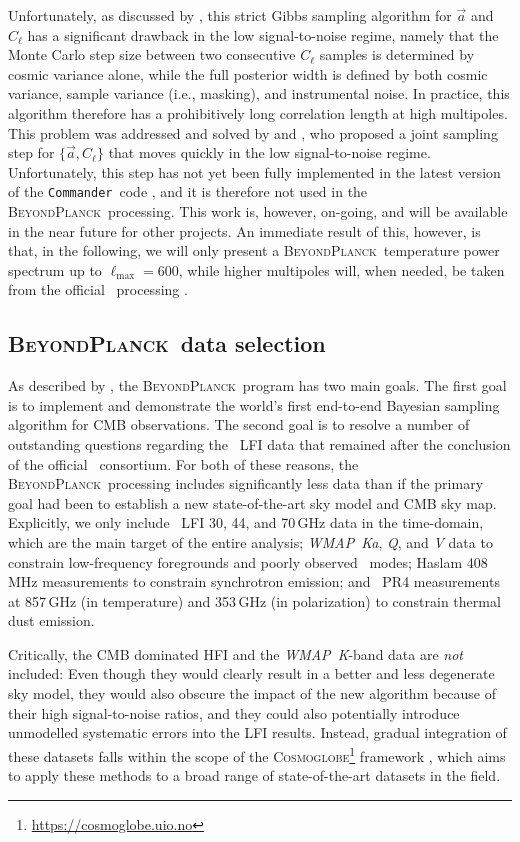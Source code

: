 \documentclass[twocolumn]{aa}
\def\cosmoglobe{\textsc{Cosmoglobe}}
\def\WMAP{\textit{WMAP}}
\def\commander{\texttt{Commander}}
\renewcommand{\a}[0]{\vec{a}}
\newcommand{\BP}{\textsc{BeyondPlanck}}
\begin{document}
Unfortunately, as discussed by \citet{eriksen:2004}, this strict Gibbs
sampling algorithm for $\a$ and $C_{\ell}$ has a significant drawback
in the low signal-to-noise regime, namely that the Monte Carlo step
size between two consecutive $C_{\ell}$ samples is determined by
cosmic variance alone, while the full posterior width is defined by
both cosmic variance, sample variance (i.e., masking), and
instrumental noise. In practice, this algorithm therefore has a
prohibitively long correlation length at high multipoles. This problem
was addressed and solved by \citet{jewell:2009} and
\citet{racine:2016}, who proposed a joint sampling step for
$\{\a,C_{\ell}\}$ that moves quickly in the low signal-to-noise
regime. Unfortunately, this step has not yet been fully implemented in
the latest version of the \commander\ code \citep{bp03}, and it is
therefore not used in the \BP\ processing. This work is, however,
on-going, and will be available in the near future for other
projects. An immediate result of this, however, is that, in the following,  we will only present a \BP\ temperature power spectrum up to
$\ell_{\mathrm{max}}=600$, while higher multipoles will, when needed, be
taken from the official \Planck\ processing \citep{planck2016-l05}. 

\subsection{\BP\ data selection}

As described by \citet{bp01}, the \BP\ program has two main goals. The
first goal is to implement and demonstrate the world's first
end-to-end Bayesian sampling algorithm for CMB observations. The
second goal is to resolve a number of outstanding questions regarding
the \Planck\ LFI data that remained after the conclusion of the
official \Planck\ consortium. For both of these reasons, the
\BP\ processing includes significantly less data than if the primary
goal had been to establish a new state-of-the-art sky model and CMB
sky map. Explicitly, we only include \Planck\ LFI 30, 44, and 70\,GHz
data in the time-domain, which are the main target of the entire analysis;
\WMAP\ \textit{Ka}, \textit Q, and \textit V data to constrain low-frequency foregrounds and
poorly observed \Planck\ modes; Haslam 408\,MHz measurements to
constrain synchrotron emission; and \Planck\ PR4 measurements at 857\,GHz (in
temperature) and 353\,GHz (in polarization) to constrain thermal dust
emission.

Critically, the CMB dominated HFI and the \WMAP\ \textit K-band data are
\emph{not} included: Even though they would clearly result in a better
and less degenerate sky model, they would also obscure the impact of
the new algorithm because of their high signal-to-noise ratios, and
they could also potentially introduce unmodelled systematic errors
into the LFI results. Instead, gradual integration of these datasets
falls within the scope of the
\cosmoglobe\footnote{\url{https://cosmoglobe.uio.no}} framework
\citep{bp05,bp17}, which aims to apply these methods to a broad range
of state-of-the-art datasets in the field.
\end{document}
